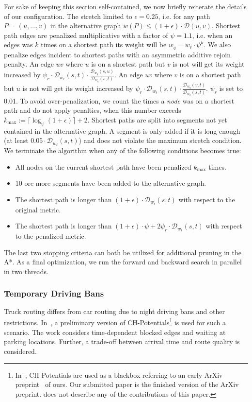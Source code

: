 \documentclass[manuscript,review]{acmart}
\newcommand*{\dist}{\mathcal{D}}
\begin{document}
For sake of keeping this section self-contained, we now briefly reiterate the details of our configuration.
The stretch limited to $\epsilon = 0.25$, i.e. for any path $P = (u,\dots,v)$ in the alternative graph $w(P) \leq (1+\epsilon) \cdot \dist(u,v)$.
Shortest path edges are penalized multiplicative with a factor of $\psi = 1.1$, i.e. when an edges was $k$ times on a shortest path its weight will be $w_q = w_{\ell}\cdot\psi^k$.
We also penalize edges incident to shortest paths with an asymmetric additive rejoin penalty.
An edge $uv$ where $u$ is on a shortest path but $v$ is not will get its weight increased by $\psi_r \cdot \dist_{w_{\ell}}(s,t) \cdot \frac{\dist_{w_q}(s,u)}{\dist_{w_q}(s,t)}$.
An edge $uv$ where $v$ is on a shortest path but $u$ is not will get its weight increased by $\psi_r \cdot \dist_{w_{\ell}}(s,t) \cdot \frac{\dist_{w_q}(v,t)}{\dist_{w_q}(s,t)}$.
$\psi_r$ is set to 0.01.
To avoid over-penalization, we count the times a \emph{node} was on a shortest path and do not apply penalties, when this number exceeds $k_{\max} := \lceil\log_{\psi}(1+\epsilon)\rceil + 2$.
Shortest paths are split into segments not yet contained in the alternative graph.
A segment is only added if it is long enough (at least $0.05 \cdot \dist_{w_{\ell}}(s,t)$) and does not violate the maximum stretch condition.
We terminate the algorithm when any of the following conditions becomes true:
\begin{itemize}
	\item All nodes on the current shortest path have been penalized $k_{\max}$ times.
	\item 10 ore more segments have been added to the alternative graph.
	\item The shortest path is longer than $(1+\epsilon) \cdot \dist_{w_{\ell}}(s,t)$ with respect to the original metric.
	\item The shortest path is longer than $(1+\epsilon) \cdot \psi + 2\psi_r \cdot \dist_{w_{\ell}}(s,t)$ with respect to the penalized metric.
\end{itemize}
The last two stopping criteria can both be utilized for additional pruning in the A*.
As a final optimization, we run the forward and backward search in parallel in two threads.

\subsubsection{Temporary Driving Bans}

Truck routing differs from car routing due to night driving bans and other restrictions.
In~\cite{kswz-erptd-p-20}, a preliminary version of CH-Potentials\footnote{
In~\cite{kswz-erptd-p-20}, CH-Potentials are used as a blackbox referring to an early ArXiv preprint~\cite{strasser2019perfect} of ours.
Our submitted paper is the finished version of the ArXiv preprint.
\cite{kswz-erptd-p-20} does not describe any of the contributions of this paper.
} is used for such a scenario.
The work considers time-dependent blocked edges and waiting at parking locations.
Further, a trade-off between arrival time and route quality is considered.
\end{document}
